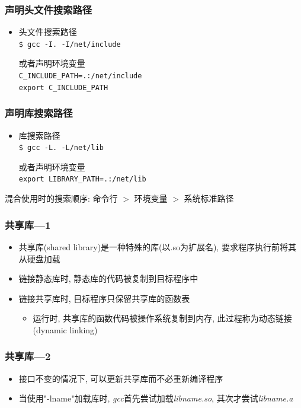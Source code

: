 \documentclass[compress]{beamer}
\begin{document}
\begin{frame}[fragile]
\frametitle{声明头文件搜索路径}

\begin{itemize}
\item 头文件搜索路径 \\
\verb~$ gcc -I. -I/net/include~

或者声明环境变量\\
\verb~C_INCLUDE_PATH=.:/net/include~\\
\verb~export C_INCLUDE_PATH~
\end{itemize}

\end{frame}

\begin{frame}[fragile]
\frametitle{声明库搜索路径}

\begin{itemize}

\item 库搜索路径\\
\verb~$ gcc -L. -L/net/lib~

或者声明环境变量\\
\verb~export LIBRARY_PATH=.:/net/lib~
\end{itemize}

混合使用时的搜索顺序: 命令行 $>$ 环境变量 $>$ 系统标准路径


\end{frame}

\begin{frame}
\frametitle{共享库---1}

\begin{itemize}
\item 共享库(shared library)是一种特殊的库(以.so为扩展名), 要求程序执行前将其从硬盘加载
\item 链接静态库时, 静态库的代码被复制到目标程序中
\item 链接共享库时, 目标程序只保留共享库的函数表
    \begin{itemize}
    \item 运行时, 共享库的函数代码被操作系统复制到内存, 此过程称为动态链接(dynamic linking)
    \end{itemize}

\end{itemize}

\end{frame}

\begin{frame}
\frametitle{共享库---2}

\begin{itemize}
\item 接口不变的情况下, 可以更新共享库而不必重新编译程序
\item 当使用"-lname"加载库时, \emph{gcc}首先尝试加载\emph{libname.so}, 
	其次才尝试\emph{libname.a}
\end{itemize}

\end{frame}
\end{document}
